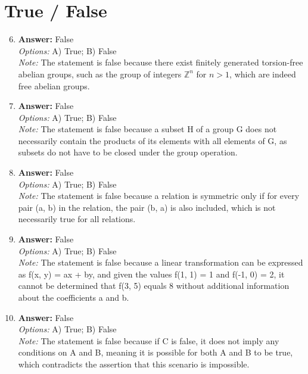\documentclass[12pt]{article}
\begin{document}
\section*{True / False}
\begin{enumerate}[label=\arabic*.]
\setcounter{enumi}{5}
\item \textbf{Answer:} False
\\ \textit{Options:} A) True; B) False
\\ \textit{Note:} The statement is false because there exist finitely generated torsion-free abelian groups, such as the group of integers \( \mathbb{Z}^n \) for \( n > 1 \), which are indeed free abelian groups.
\item \textbf{Answer:} False
\\ \textit{Options:} A) True; B) False
\\ \textit{Note:} The statement is false because a subset H of a group G does not necessarily contain the products of its elements with all elements of G, as subsets do not have to be closed under the group operation.
\item \textbf{Answer:} False
\\ \textit{Options:} A) True; B) False
\\ \textit{Note:} The statement is false because a relation is symmetric only if for every pair (a, b) in the relation, the pair (b, a) is also included, which is not necessarily true for all relations.
\item \textbf{Answer:} False
\\ \textit{Options:} A) True; B) False
\\ \textit{Note:} The statement is false because a linear transformation can be expressed as f(x, y) = ax + by, and given the values f(1, 1) = 1 and f(-1, 0) = 2, it cannot be determined that f(3, 5) equals 8 without additional information about the coefficients a and b.
\item \textbf{Answer:} False
\\ \textit{Options:} A) True; B) False
\\ \textit{Note:} The statement is false because if C is false, it does not imply any conditions on A and B, meaning it is possible for both A and B to be true, which contradicts the assertion that this scenario is impossible.
\end{enumerate}
\end{document}

